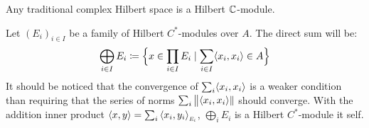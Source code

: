 \begin{exemplos}$\left.\right.$\label{exemplos de hilbert modules}
\begin{itroman}
    \item Any traditional complex Hilbert space is a Hilbert $\operatorname{\mathbb{C}}$-module.    
    \item \label{item: soma direta de modulos de hilbert} Let $(E_i)_{i\in I}$ be a family of Hilbert $C^*$-modules over $A$. The direct sum will be:
    \[
    \bigoplus_{i\in I}E_i \coloneqq \Big\{x \in \prod_{i\in I} E_i \mid \sum_{i\in I} \langle {x_i},{x_i}\rangle \in A\Big\}
    \]
    It should be noticed that the convergence of $\sum_i \langle {x_i},{x_i}\rangle$ is a weaker condition than requiring that the series of norms $\sum_i \big\|\langle {x_i},{x_i}\rangle\|$ should converge. With the addition inner product $\inner xy = \sum_{i} \sub{\inner{x_i}{y_i}}{E_i}$, $\bigoplus_{i} E_i$ is a Hilbert $C^*$-module it self.
        

\end{itroman}
\end{exemplos}
